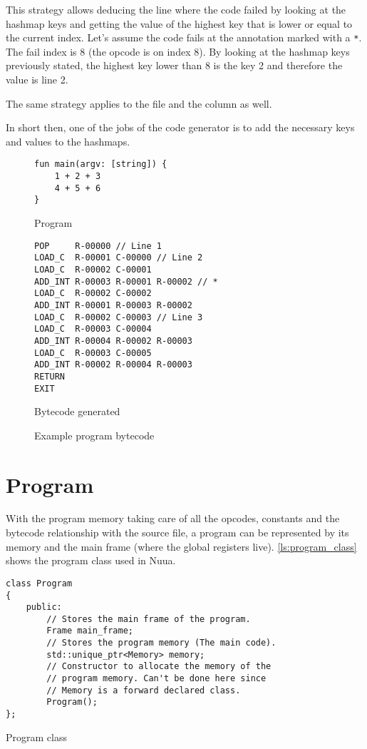 This strategy allows deducing the line where the code failed by looking at the hashmap keys and getting
the value of the highest key that is lower or equal to the current index. Let's assume the code fails at the annotation marked with a \texttt{*}.
The fail index is 8 (the opcode is on index 8). By looking at the hashmap keys previously stated, the highest key lower than 8 is the key 2
and therefore the value is line 2.

The same strategy applies to the file and the column as well.

In short then, one of the jobs of the code generator is to add the necessary keys and values to the hashmaps.

\begin{figure}[H]
	\centering
	\begin{subtable}{0.4\textwidth}
\begin{verbatim}
fun main(argv: [string]) {
    1 + 2 + 3
    4 + 5 + 6
}
\end{verbatim}
		\caption{Program}
	\end{subtable}
	\begin{subtable}{0.5\textwidth}
\begin{lstlisting}
POP     R-00000 // Line 1
LOAD_C  R-00001 C-00000 // Line 2
LOAD_C  R-00002 C-00001
ADD_INT R-00003 R-00001 R-00002 // *
LOAD_C  R-00002 C-00002
ADD_INT R-00001 R-00003 R-00002
LOAD_C  R-00002 C-00003 // Line 3
LOAD_C  R-00003 C-00004
ADD_INT R-00004 R-00002 R-00003
LOAD_C  R-00003 C-00005
ADD_INT R-00002 R-00004 R-00003
RETURN
EXIT
\end{lstlisting}
		\caption{Bytecode generated}
        \label{fig:bytecode_rel_bg}
	\end{subtable}
	\caption{Example program bytecode}
    \label{fig:bytecode_rel}
\end{figure}

\section{Program}

With the program memory taking care of all the opcodes, constants and the bytecode relationship with the source file, a program can be represented
by its memory and the main frame (where the global registers live).
\autoref{ls:program_class} shows the program class used in Nuua.

\begin{listing}[H]
\begin{verbatim}
class Program
{
    public:
        // Stores the main frame of the program.
        Frame main_frame;
        // Stores the program memory (The main code).
        std::unique_ptr<Memory> memory;
        // Constructor to allocate the memory of the
        // program memory. Can't be done here since
        // Memory is a forward declared class.
        Program();
};
\end{verbatim}
\caption{Program class}
\label{ls:program_class}
\end{listing}

